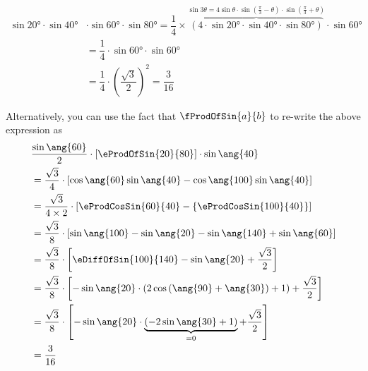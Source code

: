 \begin{solution}[\halfpage]
	\begin{fullwidth}
    \begin{align}
       \sin\ang{20}\cdot\sin\ang{40}&\cdot\sin\ang{60}\cdot\sin\ang{80} = 
       \dfrac{1}{4}\times\overbrace{(4\cdot\sin\ang{20}\cdot\sin\ang{40}\cdot\sin\ang{80})}
       ^{\sin 3\theta = 4\sin\theta\cdot\sin\left( \frac{\pi}{3} - \theta\right)\cdot\sin\left(\frac{\pi}{3} +
        \theta\right)}\cdot\sin\ang{60} \\
       &= \dfrac{1}{4}\cdot\sin\ang{60}\cdot\sin\ang{60} \\
       &= \dfrac{1}{4}\cdot\left(\dfrac{\sqrt{3}}{2} \right)^2 = \dfrac{3}{16}
    \end{align}
    
    Alternatively, you can use the fact that $\fProdOfSin{a}{b}$ to re-write the above expression as
    \begin{align}
    	&\dfrac{\sin\ang{60}}{2}\cdot\left[ \eProdOfSin{20}{80}\right]\cdot\sin\ang{40} \\
    	&= \dfrac{\sqrt{3}}{4}\cdot\left[ \cos\ang{60}\sin\ang{40} - \cos\ang{100}\sin\ang{40}\right] \\
    	&= \dfrac{\sqrt{3}}{4\times 2}\cdot\left[ \eProdCosSin{60}{40} - \left\lbrace\eProdCosSin{100}{40}\right\rbrace\right] \\
    	&= \dfrac{\sqrt{3}}{8}\cdot\left[ \sin\ang{100}-\sin\ang{20}-\sin\ang{140} + \sin\ang{60} \right] \\
    	&= \dfrac{\sqrt{3}}{8}\cdot\left[ \eDiffOfSin{100}{140} - \sin\ang{20} + \dfrac{\sqrt{3}}{2} \right]\\
    	&= \dfrac{\sqrt{3}}{8}\cdot\left[ -\sin\ang{20}\cdot(2\cos{(\ang{90} + \ang{30})} + 1) 
    	+ \dfrac{\sqrt{3}}{2} \right] \\
    	&= \dfrac{\sqrt{3}}{8}\cdot\left[ -\sin\ang{20}\cdot\underbrace{(-2\sin\ang{30} + 1)}_{ = 0 } 
    	+ \dfrac{\sqrt{3}}{2} \right] \\
    	&= \dfrac{3}{16}
    \end{align}
    \end{fullwidth}
\end{solution}
